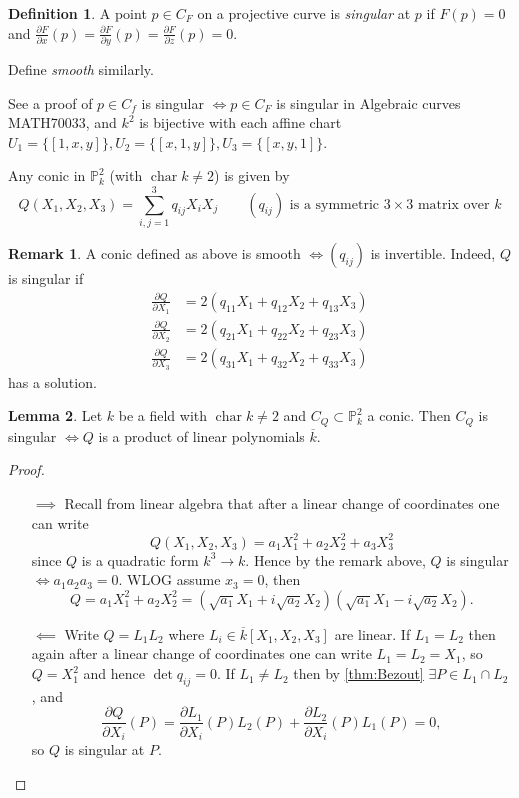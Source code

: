 \documentclass{article}
\newcommand{\p}{\mathbb{P}}
\newcommand{\Char}{\operatorname{char}}
\theoremstyle{definition}
\newtheorem{defn}{Definition}[subsection]
\newtheorem{lemma}[defn]{Lemma}
\newtheorem*{remark}{Remark}
\begin{document}
\begin{defn}
A point $p\in C_F$ on a projective curve is \textit{singular} at $p$ if $F(p)=0$ and $\frac{\partial F}{\partial x}(p)=\frac{\partial F}{\partial y}(p)=\frac{\partial F}{\partial z}(p)=0.$

Define \textit{smooth} similarly.
\end{defn}

See a proof of $p\in C_f$ is singular $\iff p\in C_F$ is singular in Algebraic curves MATH70033, and $k^2$ is bijective with each affine chart $U_1=\{[1,x,y]\},U_2=\{[x,1,y]\},U_3=\{[x,y,1]\}$.

Any conic in $\p_k^2$ (with $\Char k\neq 2$) is given by
\[
Q(X_1,X_2,X_3)=\sum_{i,j=1}^3 q_{ij}X_iX_j\qquad (q_{ij})\text{ is a symmetric }3\times 3\text{ matrix over }k
\]
\begin{remark}
A conic defined as above is smooth $\iff(q_{ij})$ is invertible. Indeed, $Q$ is singular if
\[
\begin{aligned}
\frac{\partial Q}{\partial X_1}&=2(q_{11}X_1+q_{12}X_2+q_{13}X_3) \\
\frac{\partial Q}{\partial X_2}&=2(q_{21}X_1+q_{22}X_2+q_{23}X_3) \\
\frac{\partial Q}{\partial X_3}&=2(q_{31}X_1+q_{32}X_2+q_{33}X_3)
\end{aligned}
\]
has a solution.
\end{remark}

\begin{lemma}
\label{lemma:conicsingulariffreducible}
Let $k$ be a field with $\Char k\neq 2$ and $C_Q\subset\p_k^2$ a conic. Then $C_Q$ is singular $\iff Q$ is a product of linear polynomials $\overline k$.
\end{lemma}
\begin{proof}
\begin{itemize}
\item[$\implies$] Recall from linear algebra that after a linear change of coordinates one can write
\[
Q(X_1,X_2,X_3)=a_1X_1^2+a_2X_2^2+a_3X_3^2
\]
since $Q$ is a quadratic form $k^3\rightarrow k$. Hence by the remark above, $Q$ is singular $\iff a_1a_2a_3=0$. WLOG assume $x_3=0$, then
\[
Q=a_1X_1^2+a_2X_2^2=\left(\sqrt{a_1}X_1+i\sqrt{a_2}X_2\right)\left(\sqrt{a_1}X_1-i\sqrt{a_2}X_2\right).
\]
\item[$\impliedby$] Write $Q=L_1L_2$ where $L_i\in\overline k[X_1,X_2,X_3]$ are linear. If $L_1=L_2$ then again after a linear change of coordinates one can write $L_1=L_2=X_1$, so $Q=X_1^2$ and hence $\det q_{ij}=0$. If $L_1\neq L_2$ then by \ref{thm:Bezout} $\exists P\in L_1\cap L_2$, and
\[
\frac{\partial Q}{\partial X_i}(P)=\frac{\partial L_1}{\partial X_i}(P)L_2(P)+\frac{\partial L_2}{\partial X_i}(P)L_1(P)=0,
\]
so $Q$ is singular at $P$.
\end{itemize}
\end{proof}
\end{document}
